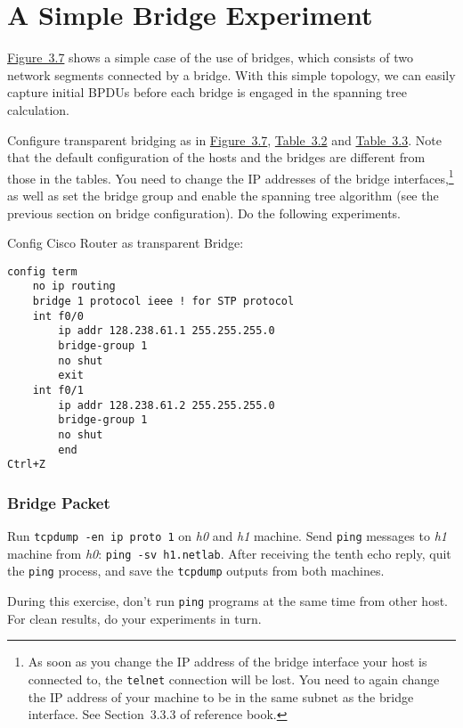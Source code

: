 \documentclass{../UTNetLab}
\begin{document}
\part{A Simple Bridge Experiment}
    \hyperref[fig:3.7]{Figure~3.7} shows a simple case of the use of bridges, which consists of two network segments connected by a bridge.
    With this simple topology, we can easily capture initial BPDUs before each bridge is engaged in the spanning tree calculation.

    Configure transparent bridging as in \hyperref[fig:3.7]{Figure~3.7}, \hyperref[tab:3.2]{Table~3.2} and \hyperref[tab:3.3]{Table~3.3}.
    Note that the default configuration of the hosts and the bridges are different from those in the tables.
    You need to change the IP addresses of the bridge interfaces,\footnote{As soon as you change the IP address of the bridge interface your host is connected to, the \lstinline{telnet} connection will be lost.
    You need to again change the IP address of your machine to be in the same subnet as the bridge interface.
    See Section~3.3.3  of reference book.} as well as set the bridge group and enable the spanning tree algorithm (see the previous section on bridge configuration).
    Do the following experiments.

    Config Cisco Router as transparent Bridge:
    \begin{lstlisting}[language={cisco}]
config term
    no ip routing
    bridge 1 protocol ieee ! for STP protocol
    int f0/0
        ip addr 128.238.61.1 255.255.255.0
        bridge-group 1
        no shut
        exit
    int f0/1
        ip addr 128.238.61.2 255.255.255.0
        bridge-group 1
        no shut
        end
Ctrl+Z
    \end{lstlisting}

\section{Bridge Packet}
    Run \lstinline{tcpdump -en ip proto 1} on \textit{h0} and \textit{h1} machine.
    Send \lstinline{ping} messages to \textit{h1} machine from \textit{h0}: \lstinline[emph={h1,netlab}]{ping -sv h1.netlab}.
    After receiving the tenth echo reply, quit the \lstinline{ping} process, and save the \lstinline{tcpdump} outputs from both machines.

    During this exercise, don’t run \lstinline{ping} programs at the same time from other host.
    For clean results, do your experiments in turn.
    
\end{document}
